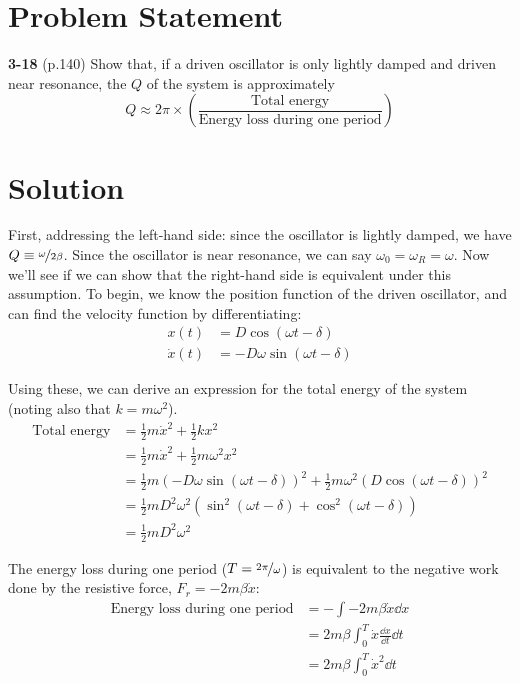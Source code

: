 \documentclass{article}
\begin{document}
\insertTitle

\section{Problem Statement}
\textbf{3-18} (p.140) Show that, if a driven oscillator is only lightly damped and driven near resonance, the $Q$ of the system is approximately
\begin{equation}
Q \approx 2\pi \times \left(\frac{\text{Total energy}}{\text{Energy loss during one period}}\right)
\end{equation}\label{Statement}

\section{Solution}
First, addressing the left-hand side: since the oscillator is lightly damped, we have $Q \equiv \nicefrac{\omega}{2\beta}$. Since the oscillator is near resonance, we can say $\omega_0 = \omega_R = \omega$. Now we'll see if we can show that the right-hand side is equivalent under this assumption. To begin, we know the position function of the driven oscillator, and can find the velocity function by differentiating:
\begin{equation*}
\begin{aligned}
x(t) &= D\cos(\omega t-\delta) \\
\dot{x}(t) &= -D\omega\sin(\omega t-\delta)
\end{aligned}
\end{equation*}

Using these, we can derive an expression for the total energy of the system (noting also that $k = m{\omega}^2$).
\begin{equation*}
\begin{aligned}
\text{Total energy} &= \frac{1}{2}m\dot{x}^2 + \frac{1}{2}kx^2 \\
&= \frac{1}{2}m\dot{x}^2 + \frac{1}{2}m{\omega}^2 x^2 \\
&= \frac{1}{2}m(-D\omega\sin(\omega t-\delta))^2 + \frac{1}{2}m{\omega}^2 (D\cos(\omega t-\delta))^2 \\
&= \frac{1}{2}mD^2\omega^2(\sin^2(\omega t-\delta)+\cos^2(\omega t-\delta)) \\
&= \frac{1}{2}mD^2\omega^2
\end{aligned}
\end{equation*}

The energy loss during one period ($T = \nicefrac{2\pi}{\omega}$) is equivalent to the negative work done by the resistive force, $F_r = -2m\beta\dot{x}$:
\begin{equation*}
\begin{aligned}
\text{Energy loss during one period} &= -\int -2m\beta\dot{x}\dd x \\
&= 2m\beta\int_0^T\dot{x}\frac{\dd x}{\dd t}\dd t \\
&= 2m\beta\int_0^T\dot{x}^2\dd t \\
\end{aligned}
\end{equation*}
\end{document}
